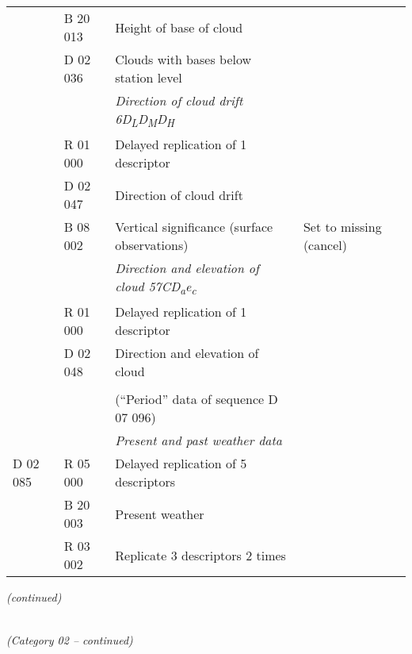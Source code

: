 \begin{longtable}[]{@{}llll@{}}
& B 20 013 & Height of base of cloud &\tabularnewline
& D 02 036 & Clouds with bases below station level &\tabularnewline
& & \emph{Direction of cloud drift 6D\textsubscript{L}D\textsubscript{M}D\textsubscript{H}} &\tabularnewline
& R 01 000 & Delayed replication of 1 descriptor &\tabularnewline
& D 02 047 & Direction of cloud drift &\tabularnewline
& B 08 002 & Vertical significance (surface observations) & Set to missing (cancel)\tabularnewline
& & \emph{Direction and elevation of cloud 57CD\textsubscript{a}e\textsubscript{c}} &\tabularnewline
& R 01 000 & Delayed replication of 1 descriptor &\tabularnewline
& D 02 048 & Direction and elevation of cloud &\tabularnewline
& & &\tabularnewline
& & (``Period'' data of sequence D 07 096) &\tabularnewline
& & \emph{Present and past weather data} &\tabularnewline
D 02 085 & R 05 000 & Delayed replication of 5 descriptors &\tabularnewline
& B 20 003 & Present weather &\tabularnewline
& R 03 002 & Replicate 3 descriptors 2 times &\tabularnewline
\bottomrule
\end{longtable}

\emph{(continued)}

\emph{\\
(Category 02 -- continued)}

